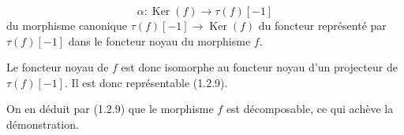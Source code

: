 \[
  \alpha\colon \operatorname{Ker}(f)\longrightarrow \tau(f)[-1]
\]
\noindent du morphisme canonique
$\tau(f)[-1]\longrightarrow\operatorname{Ker}(f)$ du foncteur représenté
par $\tau(f)[-1]$ dans le foncteur noyau du morphisme $f$.

Le foncteur noyau de $f$ est donc isomorphe au foncteur noyau d'un
projecteur de $\tau(f)[-1]$. Il est donc représentable (1.2.9).

On en déduit par (1.2.9) que le morphisme $f$ est décomposable, ce qui
achève la démonstration.
\endgroup
